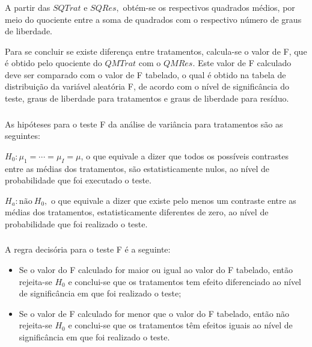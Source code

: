 \documentclass[14pt,aspectratio=1610]{beamer}
\begin{document}
\begin{frame}{}
\frametitle{}
\begin{block}{}
\justifying
A partir das $SQTrat$ e $SQRes,$ obtém-se os respectivos quadrados médios, por
meio do quociente entre a soma de quadrados com o respectivo número de graus de
liberdade.
\end{block}
\pause
\begin{block}{}
\justifying
Para se concluir se existe diferença entre tratamentos, calcula-se o valor de F, que
é obtido pelo quociente do $QMTrat$ com o $QMRes.$ Este valor de F calculado deve ser
comparado com o valor de F tabelado, o qual é obtido na tabela de distribuição da
variável aleatória F, de acordo com o nível de significância do teste, graus de liberdade para tratamentos e graus de liberdade para resíduo.
\end{block}
\end{frame}

\begin{frame}{}
\frametitle{}

As hipóteses para o teste F da análise de variância para tratamentos são as
seguintes:

\begin{block}{}
\justifying
$H_{0}:\mu_{1}=\cdots=\mu_{I}=\mu$, o que equivale a dizer que todos os possíveis contrastes entre as médias dos tratamentos, são estatisticamente nulos, ao nível de
probabilidade que foi executado o teste.
\end{block}\pause
\begin{block}{}
\justifying
$H_{a}:\textrm{não}\ H_{0},$ o que equivale a dizer que existe pelo menos um contraste entre as médias dos tratamentos, estatisticamente diferentes de zero, ao nível de probabilidade que foi realizado o teste.
\end{block}
\end{frame}

\begin{frame}{}
\frametitle{}
\begin{block}{}
\justifying
A regra decisória para o teste F é a seguinte:
\begin{itemize}
\item Se o valor do F calculado for maior ou igual ao valor do F tabelado, então rejeita-se $H_{0}$ e conclui-se que os tratamentos tem efeito diferenciado ao nível de significância em que foi realizado o teste;\pause
\item Se o valor de F calculado for menor que o valor do F tabelado, então não rejeita-se $H_{0}$ e conclui-se que os tratamentos têm efeitos iguais ao nível de significância em que foi realizado o teste.
\end{itemize}
\end{block}
\end{frame}
\end{document}
